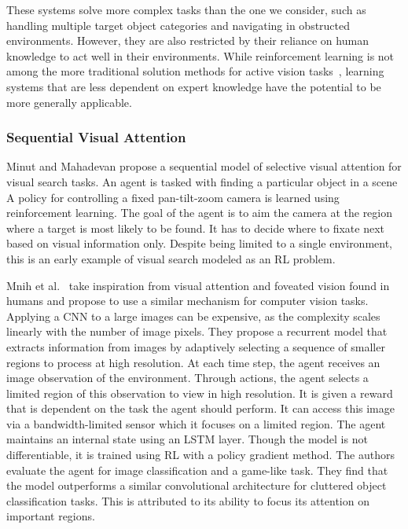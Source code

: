 These systems solve more complex tasks than the one we consider, such as handling multiple target object categories and navigating in obstructed environments.
However, they are also restricted by their reliance on human knowledge to act well in their environments.
While reinforcement learning is not among the more traditional solution methods for active vision tasks~\cite{chen_active_2011},
learning systems that are less dependent on expert knowledge have the potential to be more generally applicable.

\subsubsection{Sequential Visual Attention}

Minut and Mahadevan\cite{minut_reinforcement_2001} propose a sequential model of selective visual attention for visual search tasks.
An agent is tasked with finding a particular object in a scene
A policy for controlling a fixed pan-tilt-zoom camera is learned using reinforcement learning.
The goal of the agent is to aim the camera at the region where a target is most likely to be found.
It has to decide where to fixate next based on visual information only.
Despite being limited to a single environment, this is an early example of visual search modeled as an RL problem.

Mnih et al.~\cite{mnih_recurrent_2014} take inspiration from visual attention and foveated vision found in humans and propose to use a similar mechanism for computer vision tasks.
Applying a CNN to a large images can be expensive, as the complexity scales linearly with the number of image pixels.
They propose a recurrent model that extracts information from images by adaptively selecting a sequence of smaller regions to process at high resolution.
At each time step, the agent receives an image observation of the environment.
Through actions, the agent selects a limited region of this observation to view in high resolution.
It is given a reward that is dependent on the task the agent should perform.
It can access this image via a bandwidth-limited sensor which it focuses on a limited region.
The agent maintains an internal state using an LSTM layer.
Though the model is not differentiable, it is trained using RL with a policy gradient method.
The authors evaluate the agent for image classification and a game-like task.
They find that the model outperforms a similar convolutional architecture for cluttered object classification tasks.
This is attributed to its ability to focus its attention on important regions.

